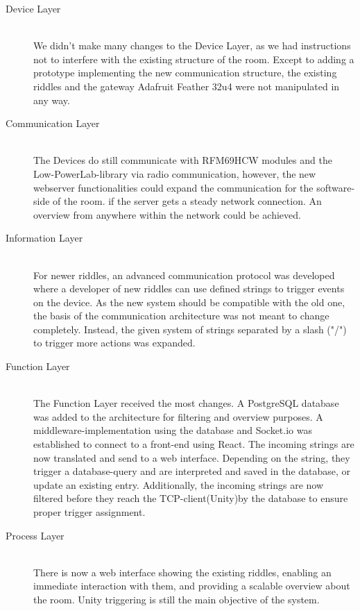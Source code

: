 \begin{description}
	\item[Device Layer]\hfill \\
	      We didn't make many changes to the Device Layer, as we had instructions not to interfere with the existing structure of the room.
	      Except to adding a prototype implementing the new communication structure, the existing riddles and the gateway Adafruit Feather 32u4 were not manipulated in any way.
	\item[Communication Layer]\hfill \\
	      The Devices do still communicate with RFM69HCW modules and the Low-PowerLab-library via radio communication,
          however, the new webserver functionalities could expand the communication for the software-side of the room. 
          if the server gets a steady network connection.
          An overview from anywhere within the network could be achieved.
	\item[Information Layer]\hfill \\
	      For newer riddles, an advanced communication protocol was developed where a developer of new riddles can use defined strings to trigger events on the device.
	      As the new system should be compatible with the old one, the basis of the communication architecture was not meant to change completely.
	      Instead, the given system of strings separated by a slash ("/") to trigger more actions was expanded.
	\item[Function Layer]\hfill \\
        The Function Layer received the most changes.
        A PostgreSQL database was added to the architecture for filtering and overview purposes.
        A middleware-implementation using the database and Socket.io was established to connect to a front-end using React. 
	      The incoming strings are now translated and send to a web interface.
	      Depending on the string, they trigger a database-query and are interpreted and saved in the database, or update an existing entry.
	      Additionally, the incoming strings are now filtered before they reach the TCP-client(Unity)by the database to ensure proper trigger assignment.
	\item[Process Layer]\hfill \\
          There is now a web interface showing the existing riddles, enabling an immediate interaction with them, 
          and providing a scalable overview about the room.
          Unity triggering is still the main objective of the system.

\end{description}

